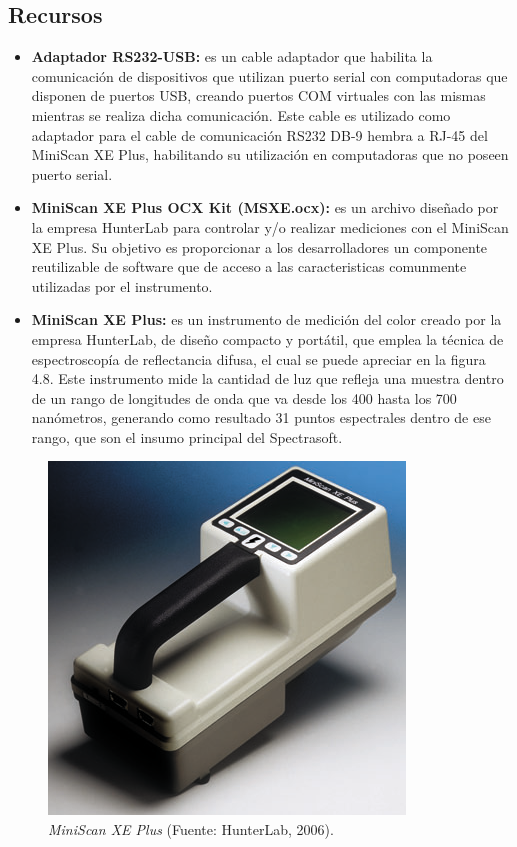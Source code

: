 	\subsection{Recursos}
	
		\begin{itemize}
			
			\item \textbf{Adaptador RS232-USB:} es un cable adaptador que habilita la comunicaci\'{o}n de dispositivos que utilizan puerto serial con computadoras que disponen de puertos USB, creando puertos COM virtuales con las mismas mientras se realiza dicha comunicaci\'{o}n. Este cable es utilizado como adaptador para el cable de comunicaci\'{o}n RS232 DB-9 hembra a RJ-45 del MiniScan XE Plus, habilitando su utilizaci\'{o}n en computadoras que no poseen puerto serial.
			
			\item \textbf{MiniScan XE Plus OCX Kit (MSXE.ocx):} es un archivo dise\~{n}ado por la empresa HunterLab para controlar y/o realizar mediciones con el MiniScan XE Plus. Su objetivo es proporcionar a los desarrolladores un componente reutilizable de software que de acceso a las caracteristicas comunmente utilizadas por el instrumento.
			
			\item \textbf{MiniScan XE Plus:} es un instrumento de medici\'{o}n del color creado por la empresa HunterLab, de dise\~{n}o compacto y port\'{a}til, que emplea la t\'{e}cnica de espectroscop\'{i}a de reflectancia difusa, el cual se puede apreciar en la figura 4.8. Este instrumento mide la cantidad de luz que refleja una muestra dentro de un rango de longitudes de onda que va desde los 400 hasta los 700 nan\'{o}metros, generando como resultado 31 puntos espectrales dentro de ese rango, que son el insumo principal del Spectrasoft.
			
		\end{itemize}
		
	\begin{figure}[H]
		\centering
		\includegraphics[scale=1]{img/MiniScanXEPlus.png}
			\caption[MiniScan XE Plus]{\textit{MiniScan XE Plus} (Fuente: HunterLab, 2006).}
	\end{figure}
\newpage
